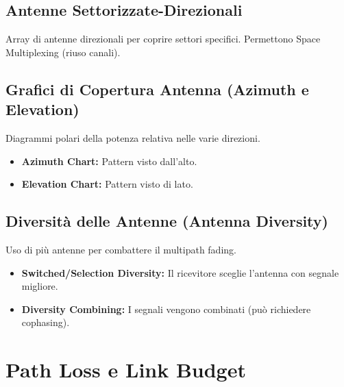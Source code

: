 \subsection{Antenne Settorizzate-Direzionali}
Array di antenne direzionali per coprire settori specifici. Permettono Space Multiplexing (riuso canali).

\subsection{Grafici di Copertura Antenna (Azimuth e Elevation)}
Diagrammi polari della potenza relativa nelle varie direzioni.
\begin{itemize}
    \item \textbf{Azimuth Chart:} Pattern visto dall'alto.
    \item \textbf{Elevation Chart:} Pattern visto di lato.
\end{itemize}

\subsection{Diversità delle Antenne (Antenna Diversity)}
Uso di più antenne per combattere il multipath fading.
\begin{itemize}
    \item \textbf{Switched/Selection Diversity:} Il ricevitore sceglie l'antenna con segnale migliore.
    \item \textbf{Diversity Combining:} I segnali vengono combinati (può richiedere cophasing).
\end{itemize}

\section{Path Loss e Link Budget}

